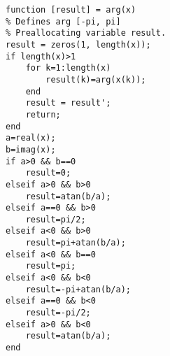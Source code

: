 \begin{verbatim}
function [result] = arg(x)
% Defines arg [-pi, pi]
% Preallocating variable result.
result = zeros(1, length(x));
if length(x)>1
    for k=1:length(x)
        result(k)=arg(x(k));
    end
    result = result';
    return;
end
a=real(x); 
b=imag(x);
if a>0 && b==0
    result=0;
elseif a>0 && b>0
    result=atan(b/a);
elseif a==0 && b>0
    result=pi/2;
elseif a<0 && b>0
    result=pi+atan(b/a);
elseif a<0 && b==0
    result=pi;
elseif a<0 && b<0
    result=-pi+atan(b/a);
elseif a==0 && b<0
    result=-pi/2;
elseif a>0 && b<0
    result=atan(b/a);
end
\end{verbatim}
